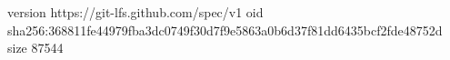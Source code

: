 version https://git-lfs.github.com/spec/v1
oid sha256:368811fe44979fba3dc0749f30d7f9e5863a0b6d37f81dd6435bcf2fde48752d
size 87544
